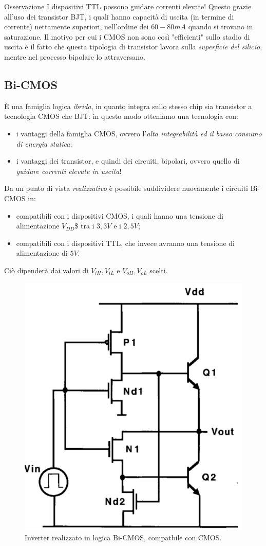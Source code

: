 \documentclass[
]{book}
\providecommand{\tightlist}{%
  \setlength{\itemsep}{0pt}\setlength{\parskip}{0pt}}
\begin{document}
\begin{bluebox}{Osservazione}
I dispositivi TTL possono guidare correnti elevate! Questo grazie all'uso dei transistor BJT, i quali hanno capacità di uscita (in termine di corrente) nettamente superiori, nell'ordine dei $60-80mA$ quando si trovano in saturazione.
\newline
Il motivo per cui i CMOS non sono così "efficienti" sullo stadio di uscita è il fatto che questa tipologia di transistor lavora sulla \emph{superficie del silicio}, mentre nel processo bipolare lo attraversano.
\end{bluebox}

\subsection{Bi-CMOS}\label{bi-cmos}

È una famiglia logica \emph{ibrida}, in quanto integra sullo stesso chip
sia transistor a tecnologia CMOS che BJT: in questo modo otteniamo una
tecnologia con:

\begin{itemize}
\tightlist
\item
  i vantaggi della famiglia CMOS, ovvero l'\emph{alta integrabilità ed
  il basso consumo di energia statica};
\item
  i vantaggi dei transistor, e quindi dei circuiti, bipolari, ovvero
  quello di \emph{guidare correnti elevate in uscita}!
\end{itemize}

Da un punto di vista \emph{realizzativo} è possibile suddividere
nuovamente i circuiti Bi-CMOS in:

\begin{itemize}
\tightlist
\item
  compatibili con i dispositivi CMOS, i quali hanno una tensione di
  alimentazione \(V_{DD}\)\$ tra i \(3,3V\) e i \(2,5V\);
\item
  compatibili con i dispositivi TTL, che invece avranno una tensione di
  alimentazione di \(5V\).
\end{itemize}

Ciò dipenderà dai valori di \(V_{iH}, V_{iL}\) e \(V_{oH}, V_{oL}\)
scelti.

\begin{figure}
\centering
\includegraphics[width=0.4\linewidth,height=\textheight,keepaspectratio]{assets/imgs/bicmos_inverter.png}
\caption{Inverter realizzato in logica Bi-CMOS, compatbile con CMOS.}
\end{figure}
\end{document}
